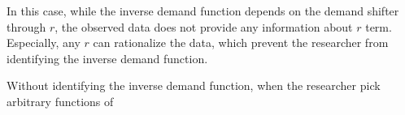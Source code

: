 \documentclass[11pt, a4paper]{article}
\theoremstyle{remark}
\begin{document}
In this case, while the inverse demand function depends on the demand shifter through $r$, the observed data does not provide any information about $r$ term.
Especially, any $r$ can rationalize the data, which prevent the researcher from identifying the inverse demand function.

Without identifying the inverse demand function, when the researcher pick arbitrary functions of 
\end{document}
